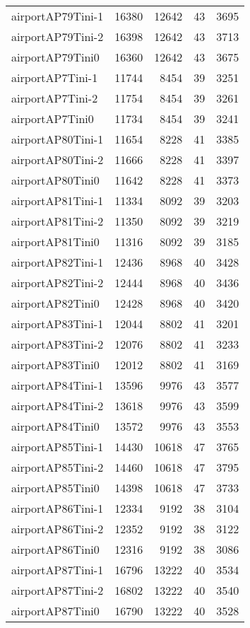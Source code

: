 \begin{longtable}{lrrrr}
airportAP79Tini-1 & 16380 & 12642 & 43 & 3695 \\
airportAP79Tini-2 & 16398 & 12642 & 43 & 3713 \\
airportAP79Tini0 & 16360 & 12642 & 43 & 3675 \\
airportAP7Tini-1 & 11744 & 8454 & 39 & 3251 \\
airportAP7Tini-2 & 11754 & 8454 & 39 & 3261 \\
airportAP7Tini0 & 11734 & 8454 & 39 & 3241 \\
airportAP80Tini-1 & 11654 & 8228 & 41 & 3385 \\
airportAP80Tini-2 & 11666 & 8228 & 41 & 3397 \\
airportAP80Tini0 & 11642 & 8228 & 41 & 3373 \\
airportAP81Tini-1 & 11334 & 8092 & 39 & 3203 \\
airportAP81Tini-2 & 11350 & 8092 & 39 & 3219 \\
airportAP81Tini0 & 11316 & 8092 & 39 & 3185 \\
airportAP82Tini-1 & 12436 & 8968 & 40 & 3428 \\
airportAP82Tini-2 & 12444 & 8968 & 40 & 3436 \\
airportAP82Tini0 & 12428 & 8968 & 40 & 3420 \\
airportAP83Tini-1 & 12044 & 8802 & 41 & 3201 \\
airportAP83Tini-2 & 12076 & 8802 & 41 & 3233 \\
airportAP83Tini0 & 12012 & 8802 & 41 & 3169 \\
airportAP84Tini-1 & 13596 & 9976 & 43 & 3577 \\
airportAP84Tini-2 & 13618 & 9976 & 43 & 3599 \\
airportAP84Tini0 & 13572 & 9976 & 43 & 3553 \\
airportAP85Tini-1 & 14430 & 10618 & 47 & 3765 \\
airportAP85Tini-2 & 14460 & 10618 & 47 & 3795 \\
airportAP85Tini0 & 14398 & 10618 & 47 & 3733 \\
airportAP86Tini-1 & 12334 & 9192 & 38 & 3104 \\
airportAP86Tini-2 & 12352 & 9192 & 38 & 3122 \\
airportAP86Tini0 & 12316 & 9192 & 38 & 3086 \\
airportAP87Tini-1 & 16796 & 13222 & 40 & 3534 \\
airportAP87Tini-2 & 16802 & 13222 & 40 & 3540 \\
airportAP87Tini0 & 16790 & 13222 & 40 & 3528 \\

\end{longtable}
